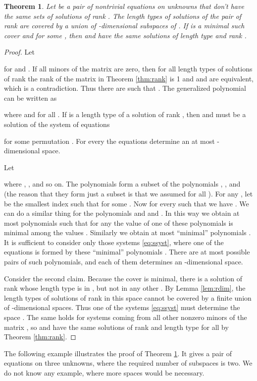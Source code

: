 \documentclass[submission]{eptcs}
\newtheorem{theorem}{Theorem}[section]
\theoremstyle{definition}
\begin{document}
\begin{theorem} \label{thm:cover}
Let  be a pair of nontrivial equations on  unknowns
that don't have the same sets of solutions of rank . The length
types of solutions of the pair of rank  are covered by a union
of  -dimensional subspaces of . If  is a minimal such cover and  for some ,
then  and  have the same solutions of length type  and
rank .
\end{theorem}
\begin{proof}
Let

for  and . If all  minors of
the  matrix  are zero, then for all length
types  of solutions of rank  the rank of the matrix
 in Theorem \ref{thm:rank} is 1 and  and  are
equivalent, which is a contradiction. Thus there are  such that
. The generalized
polynomial  can be written as

where  and  for all . If  is
a length type of a solution of rank , then  and  must
be a solution of the system of equations

for some permutation . For every  the equations
determine an at most -dimensional space.

Let

where , , and so on. The
polynomials  form a subset of the polynomials ,
,  and  (the reason that they
form just a subset is that we assumed  for all ).
For any , let  be the smallest index  such that  for some . Now for every  such that  we have . We can do a similar
thing for the polynomials  and  and . In this way we obtain at most  polynomials  such
that for any  the value of one of these polynomials is minimal
among the values . Similarly we obtain at most 
``minimal'' polynomials . It is sufficient to consider only
those systems \eqref{eq:ssyst}, where one of the equations is formed
by these ``minimal'' polynomials . There are at most
 possible pairs of such polynomials, and each of them
determines an -dimensional space.

Consider the second claim. Because the cover is minimal, there is a
solution of rank  whose length type is in , but not in any
other . By Lemma \ref{lem:rdim}, the length types of solutions
of rank  in this space cannot be covered by a finite union of
-dimensional spaces. Thus one of the systems \eqref{eq:ssyst}
must determine the space . The same holds for systems coming
from all other nonzero  minors of the matrix ,
so  and  have the same solutions of rank  and length
type  for all  by Theorem \ref{thm:rank}.
\end{proof}

The following example illustrates the proof of Theorem
\ref{thm:cover}. It gives a pair of equations on three unknowns,
where the required number of subspaces is two. We do not know any
example, where more spaces would be necessary.
\end{document}
